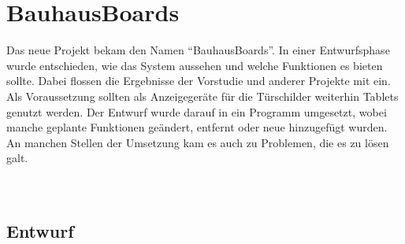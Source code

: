 \chapter{BauhausBoards}\label{BauhausBoards}
Das neue Projekt bekam den Namen ``BauhausBoards''.
In einer Entwurfsphase wurde entschieden, wie das System aussehen und welche Funktionen es bieten sollte. Dabei flossen die Ergebnisse der Vorstudie und anderer Projekte mit ein.
\\
Als Voraussetzung sollten als Anzeigegeräte für die Türschilder weiterhin Tablets genutzt werden.
Der Entwurf wurde darauf in ein Programm umgesetzt, wobei manche geplante Funktionen geändert, entfernt oder neue hinzugefügt wurden. An manchen Stellen der Umsetzung kam es auch zu Problemen, die es zu lösen galt.
\\
\\
\\



\section{Entwurf}\label{Entwurf}
